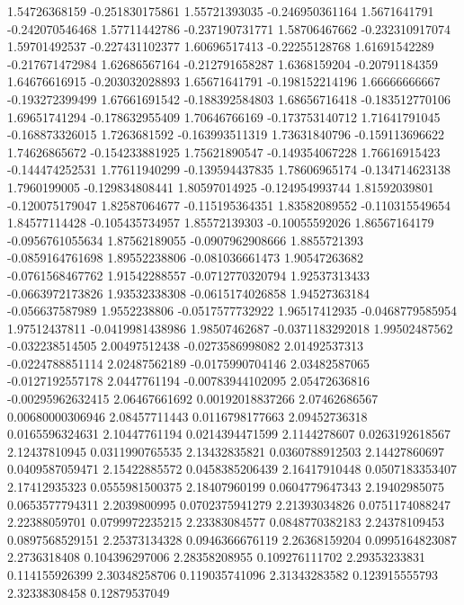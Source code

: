   1.54726368159  -0.251830175861
  1.55721393035  -0.246950361164
   1.5671641791  -0.242070546468
  1.57711442786  -0.237190731771
  1.58706467662  -0.232310917074
  1.59701492537  -0.227431102377
  1.60696517413   -0.22255128768
  1.61691542289  -0.217671472984
  1.62686567164  -0.212791658287
   1.6368159204   -0.20791184359
  1.64676616915  -0.203032028893
  1.65671641791  -0.198152214196
  1.66666666667  -0.193272399499
  1.67661691542  -0.188392584803
  1.68656716418  -0.183512770106
  1.69651741294  -0.178632955409
  1.70646766169  -0.173753140712
  1.71641791045  -0.168873326015
   1.7263681592  -0.163993511319
  1.73631840796  -0.159113696622
  1.74626865672  -0.154233881925
  1.75621890547  -0.149354067228
  1.76616915423  -0.144474252531
  1.77611940299  -0.139594437835
  1.78606965174  -0.134714623138
   1.7960199005  -0.129834808441
  1.80597014925  -0.124954993744
  1.81592039801  -0.120075179047
  1.82587064677  -0.115195364351
  1.83582089552  -0.110315549654
  1.84577114428  -0.105435734957
  1.85572139303   -0.10055592026
  1.86567164179  -0.0956761055634
  1.87562189055  -0.0907962908666
   1.8855721393  -0.0859164761698
  1.89552238806  -0.081036661473
  1.90547263682  -0.0761568467762
  1.91542288557  -0.0712770320794
  1.92537313433  -0.0663972173826
  1.93532338308  -0.0615174026858
  1.94527363184  -0.056637587989
   1.9552238806  -0.0517577732922
  1.96517412935  -0.0468779585954
  1.97512437811  -0.0419981438986
  1.98507462687  -0.0371183292018
  1.99502487562  -0.032238514505
  2.00497512438  -0.0273586998082
  2.01492537313  -0.0224788851114
  2.02487562189  -0.0175990704146
  2.03482587065  -0.0127192557178
   2.0447761194  -0.00783944102095
  2.05472636816  -0.00295962632415
  2.06467661692  0.00192018837266
  2.07462686567  0.00680000306946
  2.08457711443  0.0116798177663
  2.09452736318  0.0165596324631
  2.10447761194  0.0214394471599
   2.1144278607  0.0263192618567
  2.12437810945  0.0311990765535
  2.13432835821  0.0360788912503
  2.14427860697  0.0409587059471
  2.15422885572  0.0458385206439
  2.16417910448  0.0507183353407
  2.17412935323  0.0555981500375
  2.18407960199  0.0604779647343
  2.19402985075  0.0653577794311
   2.2039800995  0.0702375941279
  2.21393034826  0.0751174088247
  2.22388059701  0.0799972235215
  2.23383084577  0.0848770382183
  2.24378109453  0.0897568529151
  2.25373134328  0.0946366676119
  2.26368159204  0.0995164823087
   2.2736318408   0.104396297006
  2.28358208955   0.109276111702
  2.29353233831   0.114155926399
  2.30348258706   0.119035741096
  2.31343283582   0.123915555793
  2.32338308458    0.12879537049

